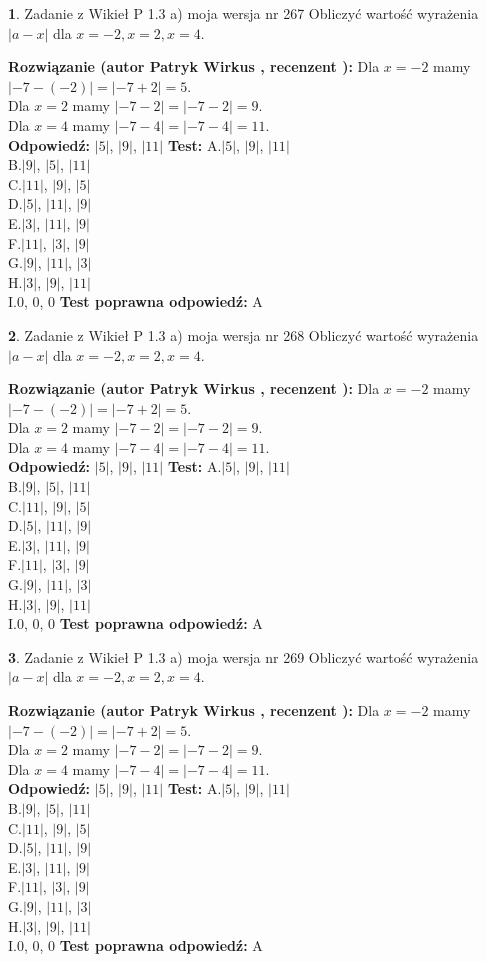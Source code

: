 \documentclass[12pt, a4paper]{article}
\theoremstyle{definition} %
\newtheorem{zad}{}
\newcommand{\zadStart}[1]{\begin{zad}#1\newline}
\newcommand{\zadStop}{\end{zad}}
\newcommand{\rozwStart}[2]{\noindent \textbf{Rozwiązanie (autor #1 , recenzent #2): }\newline}
\newcommand{\rozwStop}{\newline}
\newcommand{\odpStart}{\noindent \textbf{Odpowiedź:}\newline}
\newcommand{\odpStop}{\newline}
\newcommand{\testStart}{\noindent \textbf{Test:}\newline}
\newcommand{\testStop}{\newline}
\newcommand{\kluczStart}{\noindent \textbf{Test poprawna odpowiedź:}\newline}
\newcommand{\kluczStop}{\newline}
\begin{document}
\zadStart{Zadanie z Wikieł P 1.3 a) moja wersja nr 267}
Obliczyć wartość wyrażenia $|a - x|$ dla $x=-2,x=2,x=4$.
\zadStop
\rozwStart{Patryk Wirkus}{}
Dla $x = -2$ mamy $|-7 - (-2)| = |-7 + 2| = 5$.\\
Dla $x = 2$ mamy $|-7 - 2| = |-7 - 2| = 9$.\\
Dla $x = 4$ mamy $|-7 - 4| = |-7 - 4| = 11$.\\
\rozwStop
\odpStart
$|5|$, $|9|$, $|11|$
\odpStop
\testStart
A.$|5|$, $|9|$, $|11|$\\
B.$|9|$, $|5|$, $|11|$\\
C.$|11|$, $|9|$, $|5|$\\
D.$|5|$, $|11|$, $|9|$\\
E.$|3|$, $|11|$, $|9|$\\
F.$|11|$, $|3|$, $|9|$\\
G.$|9|$, $|11|$, $|3|$\\
H.$|3|$, $|9|$, $|11|$\\
I.$0$, $0$, $0$
\testStop
\kluczStart
A
\kluczStop



\zadStart{Zadanie z Wikieł P 1.3 a) moja wersja nr 268}
Obliczyć wartość wyrażenia $|a - x|$ dla $x=-2,x=2,x=4$.
\zadStop
\rozwStart{Patryk Wirkus}{}
Dla $x = -2$ mamy $|-7 - (-2)| = |-7 + 2| = 5$.\\
Dla $x = 2$ mamy $|-7 - 2| = |-7 - 2| = 9$.\\
Dla $x = 4$ mamy $|-7 - 4| = |-7 - 4| = 11$.\\
\rozwStop
\odpStart
$|5|$, $|9|$, $|11|$
\odpStop
\testStart
A.$|5|$, $|9|$, $|11|$\\
B.$|9|$, $|5|$, $|11|$\\
C.$|11|$, $|9|$, $|5|$\\
D.$|5|$, $|11|$, $|9|$\\
E.$|3|$, $|11|$, $|9|$\\
F.$|11|$, $|3|$, $|9|$\\
G.$|9|$, $|11|$, $|3|$\\
H.$|3|$, $|9|$, $|11|$\\
I.$0$, $0$, $0$
\testStop
\kluczStart
A
\kluczStop



\zadStart{Zadanie z Wikieł P 1.3 a) moja wersja nr 269}
Obliczyć wartość wyrażenia $|a - x|$ dla $x=-2,x=2,x=4$.
\zadStop
\rozwStart{Patryk Wirkus}{}
Dla $x = -2$ mamy $|-7 - (-2)| = |-7 + 2| = 5$.\\
Dla $x = 2$ mamy $|-7 - 2| = |-7 - 2| = 9$.\\
Dla $x = 4$ mamy $|-7 - 4| = |-7 - 4| = 11$.\\
\rozwStop
\odpStart
$|5|$, $|9|$, $|11|$
\odpStop
\testStart
A.$|5|$, $|9|$, $|11|$\\
B.$|9|$, $|5|$, $|11|$\\
C.$|11|$, $|9|$, $|5|$\\
D.$|5|$, $|11|$, $|9|$\\
E.$|3|$, $|11|$, $|9|$\\
F.$|11|$, $|3|$, $|9|$\\
G.$|9|$, $|11|$, $|3|$\\
H.$|3|$, $|9|$, $|11|$\\
I.$0$, $0$, $0$
\testStop
\kluczStart
A
\kluczStop
\end{document}
